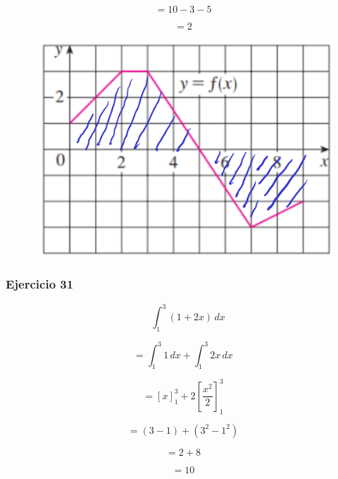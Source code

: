 \[
= 10 - 3 - 5
\]

\[
= 2
\]

\begin{figure}[H]
    \centering
    \includegraphics[scale=0.3]{images/integral5.png}
\end{figure}

\subsubsection*{Ejercicio 31}

\[
\quad \int_{1}^{3} (1 + 2x) \,dx
\]

\[
= \int_{1}^{3} 1 \,dx + \int_{1}^{3} 2x \,dx
\]

\[
= \left[ x \right]_{1}^{3} + 2 \left[ \frac{x^2}{2} \right]_{1}^{3}
\]

\[
= (3 - 1) + \left( 3^2 - 1^2 \right)
\]

\[
= 2 + 8
\]

\[
= 10
\]
